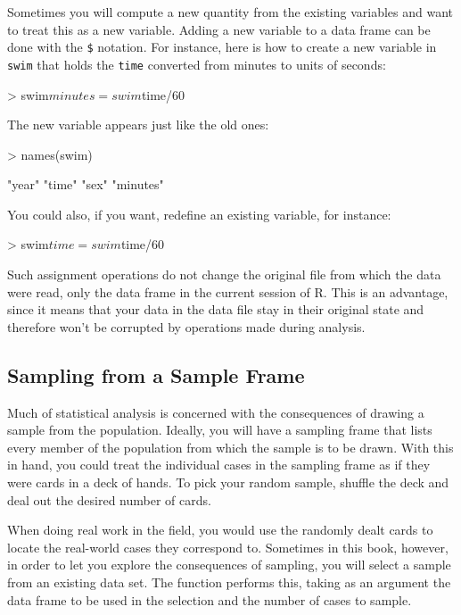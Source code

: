 Sometimes you will compute a new quantity from the existing variables and 
want to treat this as a new variable.  Adding a new variable to a data
frame can be done with the \texttt{\$} notation. 
For instance, here is how to create a new variable in \texttt{swim}
that holds the \texttt{time} converted from minutes to units of seconds:
\begin{Schunk}
\begin{Sinput}
> swim$minutes = swim$time/60
\end{Sinput}
\end{Schunk}
The new variable appears just like the old
ones:
\begin{Schunk}
\begin{Sinput}
> names(swim)
\end{Sinput}
\begin{Soutput}
[1] "year"    "time"    "sex"     "minutes"
\end{Soutput}
\end{Schunk}
You could also, if you want, redefine an existing variable, for
instance:
\begin{Schunk}
\begin{Sinput}
> swim$time = swim$time/60
\end{Sinput}
\end{Schunk}
Such assignment operations do not change the original file from which
the data were read, only the data frame in the current session of R.
This is an advantage, since it means that your data in the data file
stay in their original state and therefore won't be corrupted by
operations made during analysis.

\subsection{Sampling from a Sample Frame}


Much of statistical analysis is concerned with the consequences of
drawing a sample from the population.  
Ideally, you will
have a sampling frame that lists every member of the population from
which the sample is to be drawn.  With this in hand, you could treat
the individual cases in the sampling frame as if they were cards in a
deck of hands.  To pick your random sample, shuffle the deck and deal
out the desired number of cards.  

When doing real work in the field, you would use the randomly dealt
cards to locate the real-world cases they correspond to.  Sometimes in
this book, however, in order to let you explore the consequences of
sampling, you will select a sample from an existing data set.  The
 function performs this, taking as an argument the data
frame to be used in the selection and the number of cases to sample.

